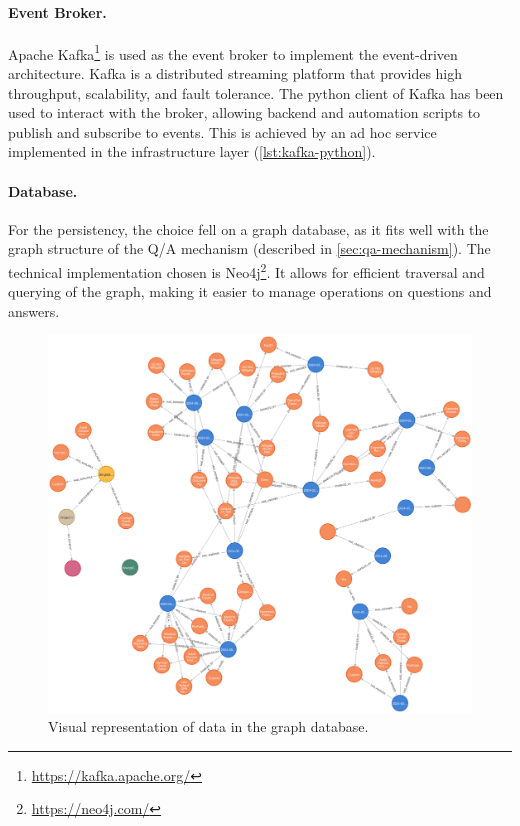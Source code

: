 \documentclass[12pt,a4paper,openright,twoside]{book}
\begin{document}
\paragraph{Event Broker.}

Apache Kafka\footnote{\url{https://kafka.apache.org/}} is used as the event broker to implement the event-driven architecture.
%
Kafka is a distributed streaming platform that provides high throughput, scalability, and fault tolerance.
%
The python client of Kafka has been used to interact with the broker, allowing backend and automation scripts to publish and subscribe to events.
%
This is achieved by an ad hoc service implemented in the infrastructure layer (\cref{lst:kafka-python}).





\paragraph{Database.}

For the persistency, the choice fell on a graph database, as it fits well with the graph structure of the \ac{Q/A} mechanism (described in \cref{sec:qa-mechanism}). The technical implementation chosen is Neo4j\footnote{\url{https://neo4j.com/}}.
%
It allows for efficient traversal and querying of the graph, making it easier to manage operations on questions and answers.


\begin{figure}
    \centering
    \includegraphics[width=0.72\linewidth]{figures/graph-db.png}
    \caption{
        Visual representation of data in the graph database.
    }
    \label{fig:graph-db}
\end{figure}
\end{document}

